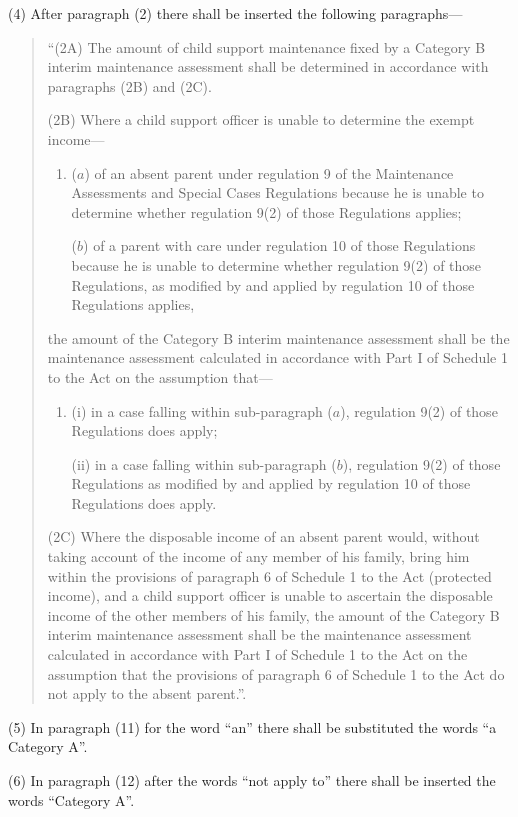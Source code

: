\documentclass[12pt,a4paper]{article}
\begin{document}
(4) After paragraph (2) there shall be inserted the following paragraphs---
\begin{quotation}
“(2A) The amount of child support maintenance fixed by a Category B interim maintenance assessment shall be determined in accordance with paragraphs (2B) and (2C).

(2B) Where a child support officer is unable to determine the exempt income---
\begin{enumerate}\item[]
($a$) of an absent parent under regulation 9 of the Maintenance Assessments and Special Cases Regulations because he is unable to determine whether regulation 9(2) of those Regulations applies;

($b$) of a parent with care under regulation 10 of those Regulations because he is unable to determine whether regulation 9(2) of those Regulations, as modified by and applied by regulation 10 of those Regulations applies,
\end{enumerate}
the amount of the Category B interim maintenance assessment shall be the maintenance assessment calculated in accordance with Part I of Schedule 1 to the Act on the assumption that---
\begin{enumerate}\item[]
(i) in a case falling within sub-paragraph ($a$), regulation 9(2) of those Regulations does apply;

(ii) in a case falling within sub-paragraph ($b$), regulation 9(2) of those Regulations as modified by and applied by regulation 10 of those Regulations does apply.
\end{enumerate}

(2C) Where the disposable income of an absent parent would, without taking account of the income of any member of his family, bring him within the provisions of paragraph 6 of Schedule 1 to the Act (protected income), and a child support officer is unable to ascertain the disposable income of the other members of his family, the amount of the Category B interim maintenance assessment shall be the maintenance assessment calculated in accordance with Part I of Schedule 1 to the Act on the assumption that the provisions of paragraph 6 of Schedule 1 to the Act do not apply to the absent parent.”.
\end{quotation}

(5) In paragraph (11) for the word “an” there shall be substituted the words “a Category A”.

(6) In paragraph (12) after the words “not apply to” there shall be inserted the words “Category A”.
\end{document}
